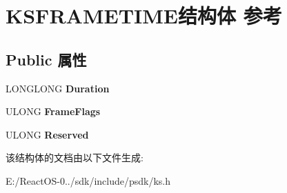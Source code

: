 \hypertarget{struct_k_s_f_r_a_m_e_t_i_m_e}{}\section{K\+S\+F\+R\+A\+M\+E\+T\+I\+M\+E结构体 参考}
\label{struct_k_s_f_r_a_m_e_t_i_m_e}
\subsection*{Public 属性}
\begin{DoxyCompactItemize}
\item 
\mbox{\label{struct_k_s_f_r_a_m_e_t_i_m_e_a3df3972b4e57add2aa12064ae960cc16}} 
L\+O\+N\+G\+L\+O\+NG {\bfseries Duration}
\item 
\mbox{\label{struct_k_s_f_r_a_m_e_t_i_m_e_a49e9bf0ab7597ae51918d48103b39fb9}} 
U\+L\+O\+NG {\bfseries Frame\+Flags}
\item 
\mbox{\label{struct_k_s_f_r_a_m_e_t_i_m_e_a582071b07f756a21ae3bf04475ea1c8e}} 
U\+L\+O\+NG {\bfseries Reserved}
\end{DoxyCompactItemize}


该结构体的文档由以下文件生成\+:\begin{DoxyCompactItemize}
\item 
E\+:/\+React\+O\+S-\/0../sdk/include/psdk/ks.\+h\end{DoxyCompactItemize}
